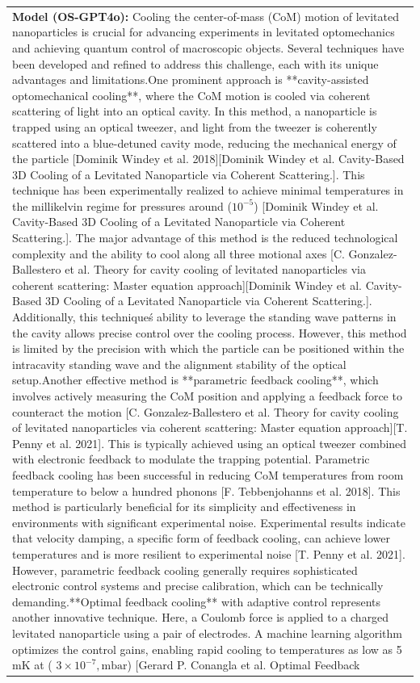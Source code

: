 \begin{table}[t!]
\begin{tabular}{p{15cm}}
\\\midrule
{\bf Model (OS-GPT4o):} Cooling the center-of-mass (CoM) motion of levitated nanoparticles is crucial for advancing experiments in levitated optomechanics and achieving quantum control of macroscopic objects. Several techniques have been developed and refined to address this challenge, each with its unique advantages and limitations.One prominent approach is **cavity-assisted optomechanical cooling**, where the CoM motion is cooled via coherent scattering of light into an optical cavity. In this method, a nanoparticle is trapped using an optical tweezer, and light from the tweezer is coherently scattered into a blue-detuned cavity mode, reducing the mechanical energy of the particle [Dominik Windey et al. 2018][Dominik Windey et al. Cavity-Based 3D Cooling of a Levitated Nanoparticle via Coherent Scattering.]. This technique has been experimentally realized to achieve minimal temperatures in the millikelvin regime for pressures around ($10^{-5}$) [Dominik Windey et al. Cavity-Based 3D Cooling of a Levitated Nanoparticle via Coherent Scattering.]. The major advantage of this method is the reduced technological complexity and the ability to cool along all three motional axes [C. Gonzalez-Ballestero et al. Theory for cavity cooling of levitated nanoparticles via coherent scattering: Master equation approach][Dominik Windey et al. Cavity-Based 3D Cooling of a Levitated Nanoparticle via Coherent Scattering.]. Additionally, this technique\'s ability to leverage the standing wave patterns in the cavity allows precise control over the cooling process. However, this method is limited by the precision with which the particle can be positioned within the intracavity standing wave and the alignment stability of the optical setup.Another effective method is **parametric feedback cooling**, which involves actively measuring the CoM position and applying a feedback force to counteract the motion [C. Gonzalez-Ballestero et al. Theory for cavity cooling of levitated nanoparticles via coherent scattering: Master equation approach][T. Penny et al. 2021]. This is typically achieved using an optical tweezer combined with electronic feedback to modulate the trapping potential. Parametric feedback cooling has been successful in reducing CoM temperatures from room temperature to below a hundred phonons [F. Tebbenjohanns et al. 2018]. This method is particularly beneficial for its simplicity and effectiveness in environments with significant experimental noise. Experimental results indicate that velocity damping, a specific form of feedback cooling, can achieve lower temperatures and is more resilient to experimental noise [T. Penny et al. 2021]. However, parametric feedback cooling generally requires sophisticated electronic control systems and precise calibration, which can be technically demanding.**Optimal feedback cooling** with adaptive control represents another innovative technique. Here, a Coulomb force is applied to a charged levitated nanoparticle using a pair of electrodes. A machine learning algorithm optimizes the control gains, enabling rapid cooling to temperatures as low as 5 mK at ( $3 \times 10^{-7}, \text{mbar}$) [Gerard P. Conangla et al. Optimal Feedback 
\end{tabular}
\end{table}
